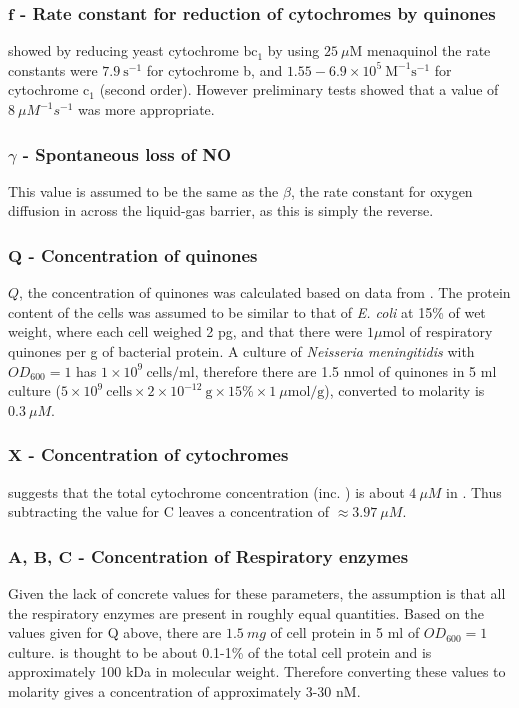 \subsubsection*{$\mathbf{f}$ {\bf- Rate constant for reduction of cytochromes by quinones}}
\citet{Snyder2000} showed by reducing yeast cytochrome $\mathrm{bc}_1$ by using $25~\mu\mathrm{M}$ menaquinol the rate constants were $7.9~\mathrm{s}^{-1}$ for cytochrome b, and $1.55-6.9\times10^5~\mathrm{M}^{-1}\mathrm{s}^{-1}$ for cytochrome $\mathrm{c}_1$ (second order). However preliminary tests showed that a value of $8~\mu M^{-1}s^{-1}$ was more appropriate.

\subsubsection*{$\gamma$ {\bf- Spontaneous loss of NO}}
This value is assumed to be the same as the $\beta$, the rate constant for oxygen diffusion in across the liquid-gas barrier, as this is simply the reverse.

\subsubsection*{$\mathbf{Q}$ {\bf- Concentration of quinones}}
$Q$, the concentration of quinones was calculated based on data from \citet{Hedrick1986}. The protein content of the cells was assumed to be similar to that of \textit{E. coli} at 15\% of wet weight, where each cell weighed 2 pg, and that there were $1\mu \textrm{mol}$ of respiratory quinones per g of bacterial protein. A culture of \textit{Neisseria meningitidis} with $OD_{600} = 1$ has $1 \times 10^9~\textrm{cells/ml}$, therefore there are 1.5 nmol of quinones in 5 ml culture ($5\times 10^9~\textrm{cells} \times 2\times 10^{-12}~\textrm{g} \times 15\% \times 1~\mu\textrm{mol/g}$), converted to molarity is $0.3~\mu M$.

\subsubsection*{$\mathbf{X}$ {\bf- Concentration of cytochromes}}
\citet{Deeudom2007} suggests that the total cytochrome concentration (inc. \cbbthree{}) is about $4~\mu M$ in \Nsm{}. Thus subtracting the value for C leaves a concentration of $\approx 3.97~\mu M$.

\subsubsection*{$\mathbf{A}$, $\mathbf{B}$, $\mathbf{C}$ {\bf- Concentration of Respiratory enzymes}}
Given the lack of concrete values for these parameters, the assumption is that all the respiratory enzymes are present in roughly equal quantities. Based on the values given for Q above, there are $1.5~mg$ of cell protein in 5 ml of $OD_{600}=1$ culture. \cbbthree{} is thought to be about 0.1-1\% of the total cell protein
and is approximately 100 kDa in molecular weight. Therefore converting these values to molarity gives a concentration of approximately 3-30 nM.

